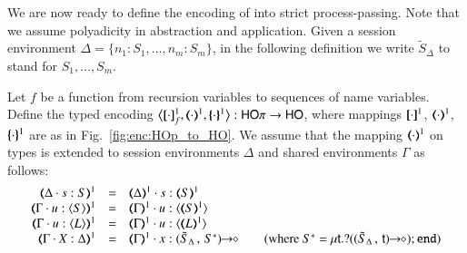 We are now ready to define the encoding of \HOp
into strict process-passing. Note that we assume polyadicity 
in abstraction and application.
Given a session environment
$\Delta = \{n_1:S_1, \ldots, n_m:S_m\}$, 
in the following definition
we write
$\tilde{S}_{\Delta}$ to stand for $S_1, \ldots, S_m$.
\begin{definition}\rm
	\label{def:enc:HOp_to_HO}
	Let $f$ be a function from recursion variables to sequences of name variables.
	Define the typed encoding $\enco{\map{\cdot}^{1}_f, \mapt{\cdot}^{1}, \mapa{\cdot}^{1}}: \HOp \to \HO$,
	where mappings $[\!\![\cdot]\!\!]^{1}$, $(\!\!\langle\cdot\rangle\!\!)^{1}$, $\{\!\!\{\cdot\}\!\!\}^{1}$
	are as in Fig.~\ref{fig:enc:HOp_to_HO}.
    We assume that the mapping $(\!\!\langle\cdot\rangle\!\!)^{1}$ on types is extended to 
    session environments $\Delta$
  and
    shared environments $\Gamma$ 
      as follows:
\[
	\begin{array}{rcll}
	    \mapt{\Delta \cat s: S}^{1} & =  & \mapt{\Delta}^{1} \cat s:\mapt{S}^{1} & \\
		\mapt{\Gamma \cat u: \chtype{S}}^{1} & =  & \mapt{\Gamma}^{1} \cat u:\chtype{\mapt{S}^{1}} & \\
		\mapt{\Gamma \cat u: \chtype{L}}^{1} & = &  \mapt{\Gamma}^{1} \cat u:\chtype{\mapt{L}^{1}} & \\
		\tmap{\Gamma \cat \varp{X}:\Delta}{1} & = & \tmap{\Gamma}{1} \cat x:\shot{(\tilde{S}_{\Delta}\,,\,S^*)} & 
		\quad\text{(where $ 
		S^* = \trec{t}{\btinp{\shot{(\tilde{S}_{\Delta}\,,\,\vart{t})}} \tinact}$)}
	\end{array}
\]

\end{definition}

